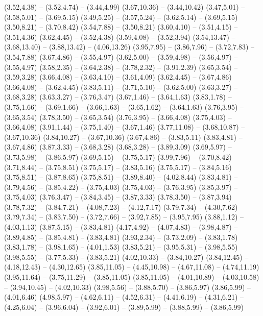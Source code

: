 {  (3.52,4.38) -- (3.52,4.74) -- (3.44,4.99)
  (3.67,10.36) -- (3.44,10.42)
  (3.47,5.01) -- (3.58,5.01) -- (3.69,5.15)
  (3.49,5.25) -- (3.57,5.24) -- (3.62,5.14) -- (3.69,5.15)
  (3.50,8.21) -- (3.70,8.42)
  (3.54,7.88) -- (3.50,8.21)
  (3.60,4.10) -- (3.51,4.15) -- (3.51,4.36)
  (3.62,4.45) -- (3.52,4.38)
  (3.59,4.08) -- (3.52,3.94)
  (3.54,13.47) -- (3.68,13.40) -- (3.88,13.42) -- (4.06,13.26)
  (3.95,7.95) -- (3.86,7.96) -- (3.72,7.83) -- (3.54,7.88)
  (3.67,4.86) -- (3.55,4.97)
  (3.62,5.00) -- (3.59,4.98) -- (3.56,4.97) -- (3.55,4.97)
  (3.58,2.35) -- (3.64,2.38) -- (3.78,2.32) -- (3.91,2.39)
  (3.65,3.54) -- (3.59,3.28)
  (3.66,4.08) -- (3.63,4.10) -- (3.61,4.09)
  (3.62,4.45) -- (3.67,4.86)
  (3.66,4.08) -- (3.62,4.45)
  (3.83,5.11) -- (3.71,5.10) -- (3.62,5.00)
  (3.63,3.27) -- (3.68,3.28)
  (3.63,3.27) -- (3.76,3.47)
  (3.67,1.46) -- (3.64,1.63)
  (3.83,1.78) -- (3.75,1.66) -- (3.69,1.66) -- (3.66,1.63) -- (3.65,1.62) -- (3.64,1.63)
  (3.76,3.95) -- (3.65,3.54)
  (3.78,3.50) -- (3.65,3.54)
  (3.76,3.95) -- (3.66,4.08)
  (3.75,4.03) -- (3.66,4.08)
  (3.91,1.44) -- (3.75,1.40) -- (3.67,1.46)
  (3.77,11.08) -- (3.68,10.87) -- (3.67,10.36)
  (3.84,10.27) -- (3.67,10.36)
  (3.67,4.86) -- (3.83,5.11)
  (3.83,4.81) -- (3.67,4.86)
  (3.87,3.33) -- (3.68,3.28)
  (3.68,3.28) -- (3.89,3.09)
  (3.69,5.97) -- (3.73,5.98) -- (3.86,5.97)
  (3.69,5.15) -- (3.75,5.17)
  (3.99,7.96) -- (3.70,8.42)
  (3.71,8.44) -- (3.75,8.51)
  (3.75,5.17) -- (3.83,5.16)
  (3.75,5.17) -- (3.84,5.16)
  (3.75,8.51) -- (3.87,8.65)
  (3.75,8.51) -- (3.89,8.40) -- (4.02,8.44)
  (3.83,4.81) -- (3.79,4.56) -- (3.85,4.22) -- (3.75,4.03)
  (3.75,4.03) -- (3.76,3.95)
  (3.85,3.97) -- (3.75,4.03)
  (3.76,3.47) -- (3.84,3.45) -- (3.87,3.33)
  (3.78,3.50) -- (3.87,3.94)
  (3.78,7.32) -- (3.84,7.21) -- (4.08,7.23) -- (4.12,7.17)
  (3.79,7.34) -- (4.30,7.62)
  (3.79,7.34) -- (3.83,7.50) -- (3.72,7.66) -- (3.92,7.85) -- (3.95,7.95)
  (3.88,1.12) -- (4.03,1.13)
  (3.87,5.15) -- (3.83,4.81)
  (4.17,4.92) -- (4.07,4.83) -- (3.98,4.87) -- (3.89,4.85) -- (3.85,4.81) -- (3.83,4.81)
  (3.93,2.34) -- (3.73,2.09) -- (3.83,1.78)
  (3.83,1.78) -- (3.98,1.65) -- (4.01,1.53)
  (3.83,5.21) -- (3.95,5.31) -- (3.98,5.55)
  (3.98,5.55) -- (3.77,5.33) -- (3.83,5.21)
  (4.02,10.33) -- (3.84,10.27)
  (3.84,12.45) -- (4.18,12.43) -- (4.30,12.65)
  (3.85,11.05) -- (4.45,10.98) -- (4.67,11.08) -- (4.74,11.19)
  (3.95,11.64) -- (3.75,11.29) -- (3.85,11.05)
  (3.85,11.05) -- (4.01,10.89) -- (4.03,10.58) -- (3.94,10.45) -- (4.02,10.33)
  (3.98,5.56) -- (3.88,5.70) -- (3.86,5.97)
  (3.86,5.99) -- (4.01,6.46)
  (4.98,5.97) -- (4.62,6.11) -- (4.52,6.31) -- (4.41,6.19) -- (4.31,6.21) -- (4.25,6.04) -- (3.96,6.04) -- (3.92,6.01) -- (3.89,5.99) -- (3.88,5.99) -- (3.86,5.99)
}
